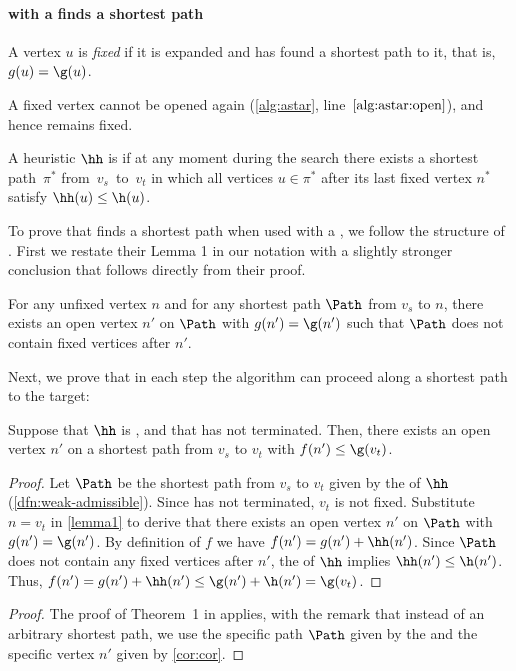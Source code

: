 \paragraph{\A with a \wah finds a shortest path}
\label{sec:weak-admissible-dfn}

\begin{definition}
  A vertex $u$ is \emph{fixed} if it is expanded and \A has found a shortest path
  to it, that is, $g(u) = \g(u)$.
\end{definition}
A fixed vertex cannot be opened again (\cref{alg:astar}, line~$\ref{alg:astar:open}$),
and hence remains fixed.

\begin{definition}[\Wa]\label{dfn:weak-admissible}%
  A heuristic $\hh$ is \emph{\wa} if at any moment during the \A search there
  exists a shortest path~$\pi^*$ from~$v_s$~to~$v_t$ in which all vertices $u
  \in \pi^*$ after its last fixed vertex $n^*$ satisfy $\hh(u) \leq \h(u)$.
\end{definition}

To prove that \A finds a shortest path when used with a \wah, we follow the
structure of \citet{hart1968formal}. First we restate their Lemma 1 in our
notation with a slightly stronger conclusion that follows directly from
their proof.

\begin{lem}\label{lemma1}
  For any unfixed vertex $n$ and for any shortest path $\Path$ from $v_s$ to $n$,
  there exists an open vertex $n'$ on $\Path$ with $g(n') = \g(n')$ such that
  $\Path$ does not contain fixed vertices after $n'$.
\end{lem}

Next, we prove that in each step the \A algorithm can proceed along a shortest path
to the target:

\begin{cor}\label{cor:cor}
  Suppose that $\hh$ is \wa, and that \A has not terminated. Then, there exists
  an open vertex $n'$ on a shortest path from $v_s$ to $v_t$ with $f(n') \leq
  \g(v_t)$.
\end{cor}
\begin{proof}
  Let $\Path$ be the shortest path from $v_s$ to $v_t$ given by the \way of $\hh$ (\cref{dfn:weak-admissible}).
  Since \A has not terminated, $v_t$ is not fixed.
  Substitute ${n=v_t}$ in \cref{lemma1} to derive that
  there exists an open vertex $n'$ on $\Path$ with $g(n') = \g(n')$. By
  definition of $f$ we have $f(n') = g(n') + \hh(n')$. Since $\Path$ does not
  contain any fixed vertices after $n'$, the \way of $\hh$ implies $\hh(n')
  \leq \h(n')$. Thus, ${f(n') = g(n') + \hh(n') \leq \g(n') + \h(n') = \g(v_t)}$.
\end{proof}

\thmpartialadmissibledfn*
\begin{proof}
  The proof of Theorem~1 in \citet{hart1968formal} applies, with the remark that
  instead of an arbitrary shortest path, we use the specific path $\Path$
  given by the \way and the specific vertex $n'$ given by \cref{cor:cor}.
\end{proof}
